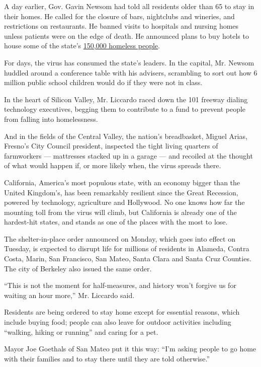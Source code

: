 A day earlier, Gov. Gavin Newsom had told all residents older than 65 to
stay in their homes. He called for the closure of bars, nightclubs and
wineries, and restrictions on restaurants. He banned visits to hospitals
and nursing homes unless patients were on the edge of death. He
announced plans to buy hotels to house some of the state's
\href{https://www.nytimes3xbfgragh.onion/2020/03/10/us/coronavirus-homeless.html}{150,000
homeless people}.

For days, the virus has consumed the state's leaders. In the capital,
Mr. Newsom huddled around a conference table with his advisers,
scrambling to sort out how 6 million public school children would do if
they were not in class.

In the heart of Silicon Valley, Mr. Liccardo raced down the 101 freeway
dialing technology executives, begging them to contribute to a fund to
prevent people from falling into homelessness.

And in the fields of the Central Valley, the nation's breadbasket,
Miguel Arias, Fresno's City Council president, inspected the tight
living quarters of farmworkers --- mattresses stacked up in a garage ---
and recoiled at the thought of what would happen if, or more likely
when, the virus spreads there.

California, America's most populous state, with an economy bigger than
the United Kingdom's, has been remarkably resilient since the Great
Recession, powered by technology, agriculture and Hollywood. No one
knows how far the mounting toll from the virus will climb, but
California is already one of the hardest-hit states, and stands as one
of the places with the most to lose.

The shelter-in-place order announced on Monday, which goes into effect
on Tuesday, is expected to disrupt life for millions of residents in
Alameda, Contra Costa, Marin, San Francisco, San Mateo, Santa Clara and
Santa Cruz Counties. The city of Berkeley also issued the same order.

``This is not the moment for half-measures, and history won't forgive us
for waiting an hour more,'' Mr. Liccardo said.

Residents are being ordered to stay home except for essential reasons,
which include buying food; people can also leave for outdoor activities
including ``walking, hiking or running'' and caring for a pet.

Mayor Joe Goethals of San Mateo put it this way: ``I'm asking people to
go home with their families and to stay there until they are told
otherwise.''

